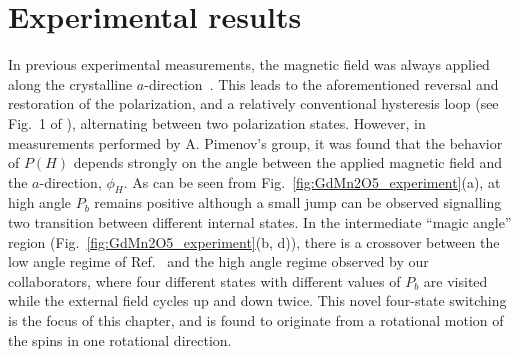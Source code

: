 \section{Experimental results}
\begin{figure*}[t]
    \centering
\caption{ \label{fig:GdMn2O5_experiment} {\bf Experimental measurements of the electric polarization.} (a) At higher temperatures only a small step is seen at the transition that shows some hysteresis and the two-state switching; (b) 4-state switching starts to appear approximately from $T=5$~K.(c) four-state hysteresis loop is clearly seen at $T=2.3$~K with the magnetic field at the ``magic'' angle;  
(d-f) Field dependence of the electric polarization of GdMn$_2$O$_5$ for different off-axis orientations of the applied magnetic field. (d,f): Conventional two-state switching is observed if magnetic field is (d) far away from the ``magic" direction  or (f) very close to the crystallographic $a$-axis. (e,g): Unusual four-state hysteresis loop for the magnetic field direction close to the magic angle of $\pm 9^o$. The inset shows the sequence of the magnetic field-sweeps. The labels 1-4 mark the four polarization states. The arrows show the direction of magnetic field-change during the sweep. The experiments have been done at $T=2.3$\,K. }
\end{figure*}
In previous experimental measurements, the magnetic field was always applied along the crystalline $a$-direction~\cite{Lee13}.
This leads to the aforementioned reversal and restoration of the polarization, and a relatively conventional hysteresis loop (see Fig.~1 of \cite{Lee13}), alternating between two polarization states. However, in measurements performed by A. Pimenov's group, it was found that the behavior of $P(H)$ depends strongly on the angle between the applied magnetic field and the $a$-direction, $\phi_H$.
As can be seen from Fig.~\ref{fig:GdMn2O5_experiment}(a), at high angle $P_b$ remains positive although a small jump can be observed signalling two transition between different internal states.
In the intermediate ``magic angle'' region (Fig.~\ref{fig:GdMn2O5_experiment}(b, d)), there is a crossover between the low angle regime of Ref.~\cite{Lee13} and the high angle regime observed by our collaborators, where four different states with different values of $P_b$ are visited while the external field cycles up and down twice.
This novel four-state switching is the focus of this chapter, and is found to originate from a rotational motion of the spins in one rotational direction.
